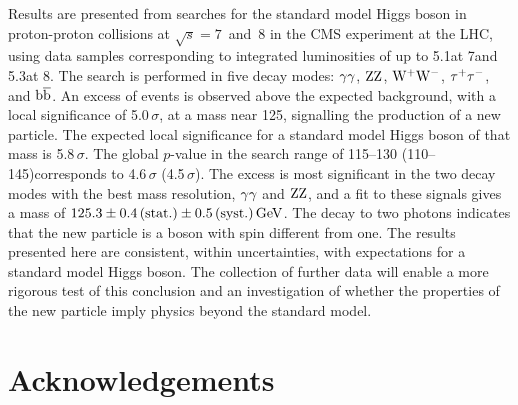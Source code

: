 \documentclass[11pt,twoside,a4paper,cmspaper,final]{cms-tdr}
\begin{document}
Results are presented from searches for the standard model Higgs boson
in proton-proton collisions at $\sqrt{s}=7$~and~8\TeV
in the CMS experiment at the LHC, using data samples corresponding
to integrated luminosities of
up to 5.1\fbinv at 7\TeV and 5.3\fbinv at 8\TeV.
The search is performed in five decay modes:
$\gamma\gamma$, $\mathrm{Z}\mathrm{Z}$, $\mathrm{W^+}\mathrm{W^-}$, $\tau^+\tau^-$, and $\mathrm{b}\overline{\mathrm{b}}$.
An excess of events  is observed above the expected background, with
a local significance of 5.0$\,\sigma$, at a mass near
125\GeV, signalling the production of a new particle.
The expected local significance for a standard model Higgs boson of that mass is 5.8$\,\sigma$.
The global $p$-value in the search range of 115--130 (110--145)\GeV corresponds to 4.6\,$\sigma$ (4.5\,$\sigma$).
The excess is most significant in the two decay modes with
the best mass resolution, $\gamma\gamma$ and $\mathrm{Z}\mathrm{Z}$, and a
fit to these signals gives a mass of
$125.3\pm 0.4\,(\text{stat.})\pm 0.5\,(\text{syst.})\,\text{Ge\hspace{-.08em}V}$.
The decay to two photons indicates that the new particle is a boson with spin different from one. The results presented here are consistent,
within uncertainties, with expectations for a standard model Higgs boson.
The collection of further data will enable a more rigorous test of this conclusion and an investigation
of whether the properties of the new particle imply physics beyond the standard model.

\section*{Acknowledgements}
\end{document}
